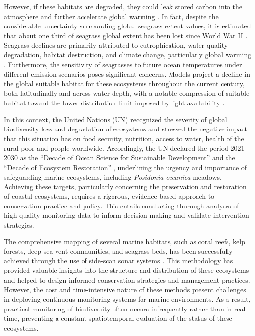 However, if these habitats are degraded, they could leak stored carbon into the
atmosphere and further accelerate global warming
\cite{DuarteNCC2013,Macreadie2014}. In fact, despite the considerable
uncertainty surrounding global seagrass extent values, it is estimated that
about one third of seagrass global extent has been lost since World War II
\cite{DuarteNCC2013}. Seagrass declines are primarily attributed to
eutrophication, water quality degradation, habitat destruction, and climate
change, particularly global warming \cite{Waycott2009}. Furthermore, the
sensitivity of seagrasses to future ocean temperatures under different emission
scenarios poses significant concerns. Models project a decline in the global
suitable habitat for these ecosystems throughout the current century, both
latitudinally and across water depth, with a notable compression of suitable
habitat toward the lower distribution limit imposed by light availability
\cite{Jorda2020}.

In this context, the United Nations (UN) recognized the severity of global
biodiversity loss and degradation of ecosystems and stressed the negative
impact that this situation has on food security, nutrition, access to water,
health of the rural poor and people worldwide. Accordingly, the UN declared the
period 2021-2030 as the ``Decade of Ocean Science for Sustainable Development''
and the ``Decade of Ecosystem Restoration'' \cite{UNdecade2000, UNRio},
underlining the urgency and importance of safeguarding marine ecosystems,
including \textit{Posidonia oceanica} meadows. Achieving these targets,
particularly concerning the preservation and restoration of coastal ecosystems,
requires a rigorous, evidence-based approach to
conservation practice and policy. This entails conducting thorough analyses of
high-quality monitoring data to inform decision-making and validate
intervention strategies.

The comprehensive mapping of several marine habitats,
such as coral reefs, kelp forests, deep-sea vent communities, and seagrass
beds, has been successfully achieved through the use of side-scan sonar systems
\cite{Mumby2002, Mishra2006, LeQuilleuc2022, allen-coral-atlas}. This
methodology has provided valuable insights into the structure and distribution
of these ecosystems and helped to design informed conservation strategies and
management practices. However, the cost and time-intensive nature of these
methods present challenges in deploying continuous monitoring systems for
marine environments. As a result, practical monitoring of biodiversity often
occurs infrequently rather than in real-time, preventing a constant
spatiotemporal evaluation of the status of these ecosystems.

